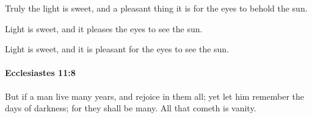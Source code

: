 			\begin{versebox}
					\item[BHS] 
					\item[LXX] 
					\item[ASV] Truly the light is sweet, and a pleasant thing it is for the eyes to behold the sun.
					\item[NIV] Light is sweet, and it pleases the eyes to see the sun.
					\item[NRSV] Light is sweet, and it is pleasant for the eyes to see the sun.
			\end{versebox}

		\paragraph{Ecclesiastes 11:8} %
			\label{ECCLESIASTES-11-8}

			But if a man live many years, and rejoice in them all; yet let him remember the days of darkness; for they shall be many. All that cometh is vanity.

